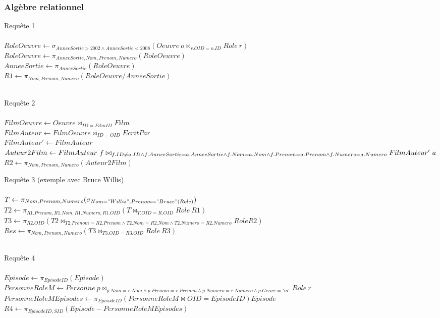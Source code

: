 \documentclass[10pt,a4paper]{article}
\begin{document}
\subsubsection{Algèbre relationnel}
\begin{list}{*}{}
\item Requête 1
\\ \\
$
RoleOeuvre \leftarrow \sigma_{ AnneeSortie > 2002 \wedge AnneeSortie < 2008  } ( Oeuvre \ o \bowtie_{ r.OID = o.ID  } Role \ r) 
$\\$
RoleOeuvre \leftarrow \pi_{AnneeSortie, Nom, Prenom, Numero}(RoleOeuvre) $\\
$AnneeSortie \leftarrow \pi_{AnneeSortie}(RoleOeuvre)$\\
$R1 \leftarrow \pi_{Nom, Prenom, Numero}(RoleOeuvre / AnneeSortie)$
\\
\\	\item Requête 2
\\ \\ 
$ FilmOeuvre \leftarrow Oeuvre \bowtie_{ID = FilmID} Film$ \\ 
$FilmAuteur \leftarrow FilmOeuvre \bowtie_{ID = OID} EcritPar$ \\
$FilmAuteur' \leftarrow FilmAuteur$\\
$Auteur2Film \leftarrow FilmAuteur \ f \bowtie_{f.ID \neq a.ID \wedge \\
	f.AnneeSortie = a.AnneeSortie \wedge f.Nom = a.Nom \wedge f.Prenom = a.Prenom \wedge f.Numero = a.Numero} FilmAuteur' \ a$\\
$R2 \leftarrow \pi_{Nom, Prenom, Numero} (Auteur2Film)$
\\
\item Requête 3 (exemple avec Bruce Willis)
\\ \\ 
$ T \leftarrow \pi_{Nom, Prenom, Numero} (\sigma_{Nom = "Willis", Prenom = "Bruce"(Role)})$ \\
$ T2 \leftarrow \pi_{R1.Prenom, R1.Nom, R1.Numero, R1.OID} (T \bowtie_{T.OID = R.OID} Role \ R1 )$ \\
$ T3 \leftarrow  \pi_{R2.OID} (T2 \bowtie_{T2.Prenom = R2.Prenom \wedge T2.Nom = R2.Nom \wedge T2.Numero = R2.Numero} Role R2)$ \\
$ Res \leftarrow \pi_{Nom, Prenom, Numero} (T3 \bowtie_{T3.OID = R3.OID} Role \ R3)$
\\
\\
\item Requête 4
\\ \\
$Episode \leftarrow \pi_{EpisodeID}(Episode)$\\
$PersonneRoleM \leftarrow Personne \ p \bowtie_{p.Nom = r.Nom \wedge p.Prenom = r.Prenom \wedge p.Numero = r.Numero \wedge p.Genre='m'} Role \ r$\\
$PersonneRoleMEpisodes \leftarrow \pi_{EpisodeID} (PersonneRoleM \bowtie {OID=EpisodeID}) Episode$\\
$R4 \leftarrow \pi_{EpisodeID, SID}(Episode - PersonneRoleMEpisodes)$
\\
\\
\end{list}
\end{document}
